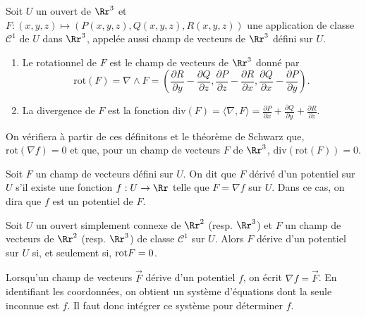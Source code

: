 \documentclass[12pt, class=report,crop=false]{standalone}
\begin{document}
\begin{definition}Soit $U$ un ouvert de $\Rr^3$ et $F:(x,y,z)\mapsto \left(P(x,y,z),Q(x,y,z),R(x,y,z)\right)$ une application de classe $\mathscr{C}^1$ de $U$ dans $\Rr^3$, appelée aussi champ de vecteurs de $\Rr^3$ défini sur $U$.
\begin{enumerate}
\item Le rotationnel de $F$ est le champ de vecteurs de $\Rr^3$ donné par
$$\mathrm{rot}(F)=\nabla \wedge F=\left(\frac{\partial R}{\partial y}-\frac{\partial Q}{\partial z},\frac{\partial P}{\partial z}-\frac{\partial R}{\partial x},\frac{\partial Q}{\partial x}-\frac{\partial P}{\partial y}\right).$$
\item La divergence de $F$ est la fonction $\displaystyle \mathrm{div}(F)=\langle \nabla ,F\rangle =\frac{\partial P}{\partial x}+\frac{\partial Q}{\partial y}+\frac{\partial R}{\partial z}$.
\end{enumerate}
\end{definition}

\vskip4mm

\noindent On vérifiera à partir de ces définitons et le théorème de Schwarz que, $\mbox{rot}(\nabla f)=0$ et que, pour un champ de vecteurs $F$ de $\Rr^3$, $\mathrm{div}(\mathrm{rot}(F))=0$.

\vskip6mm

\begin{definition}Soit $F$ un champ de vecteurs défini sur $U$. On dit que $F$ dérivé d'un potentiel sur $U$ s'il existe une fonction $f:U\to \Rr$ telle que $F= \nabla f$ sur $U$. Dans ce cas, on dira que $f$ est un potentiel de $F$.
\end{definition}

\vskip4mm

\begin{theoreme}[\bf Poincaré]Soit $U$ un ouvert simplement connexe de $\Rr^2$ (resp. $\Rr^3$) et $F$ un champ de vecteurs de $\Rr^2$ (resp. $\Rr^3$) de classe ${\mathscr C}^1$ sur $U$. Alors $F$ dérive d'un potentiel sur $U$ si, et seulement si, $\mathrm{rot} F=0$.
\end{theoreme}

\vskip6mm

Lorsqu'un champ de vecteurs $\overrightarrow{F}$ dérive d'un potentiel $f$, on écrit $\displaystyle \nabla f=\overrightarrow{F}$. En identifiant les coordonnées, on obtient un système d'équations dont la seule inconnue est $f$. Il faut donc intégrer ce système pour déterminer $f$.
\end{document}
